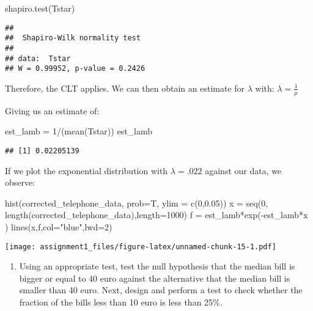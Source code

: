 \documentclass[
]{article}
\newenvironment{Shaded}{\begin{snugshade}}{\end{snugshade}}
\newcommand{\AttributeTok}[1]{\textcolor[rgb]{0.77,0.63,0.00}{#1}}
\newcommand{\DecValTok}[1]{\textcolor[rgb]{0.00,0.00,0.81}{#1}}
\newcommand{\FloatTok}[1]{\textcolor[rgb]{0.00,0.00,0.81}{#1}}
\newcommand{\FunctionTok}[1]{\textcolor[rgb]{0.00,0.00,0.00}{#1}}
\newcommand{\NormalTok}[1]{#1}
\newcommand{\OtherTok}[1]{\textcolor[rgb]{0.56,0.35,0.01}{#1}}
\newcommand{\SpecialCharTok}[1]{\textcolor[rgb]{0.00,0.00,0.00}{#1}}
\newcommand{\StringTok}[1]{\textcolor[rgb]{0.31,0.60,0.02}{#1}}
\providecommand{\tightlist}{%
  \setlength{\itemsep}{0pt}\setlength{\parskip}{0pt}}
\begin{document}
\begin{Shaded}
\begin{Highlighting}[]
\FunctionTok{shapiro.test}\NormalTok{(Tstar)}
\end{Highlighting}
\end{Shaded}

\begin{verbatim}
## 
##  Shapiro-Wilk normality test
## 
## data:  Tstar
## W = 0.99952, p-value = 0.2426
\end{verbatim}

Therefore, the CLT applies. We can then obtain an estimate for
\(\lambda\) with: \(\lambda = \frac{1}{\mu}\)

Giving us an estimate of:

\begin{Shaded}
\begin{Highlighting}[]
\NormalTok{est\_lamb }\OtherTok{=} \DecValTok{1}\SpecialCharTok{/}\NormalTok{(}\FunctionTok{mean}\NormalTok{(Tstar))}
\NormalTok{est\_lamb}
\end{Highlighting}
\end{Shaded}

\begin{verbatim}
## [1] 0.02205139
\end{verbatim}

If we plot the exponential distribution with \(\lambda = .022\) against
our data, we observe:

\begin{Shaded}
\begin{Highlighting}[]
\FunctionTok{hist}\NormalTok{(corrected\_telephone\_data, }\AttributeTok{prob=}\NormalTok{T, }\AttributeTok{ylim =} \FunctionTok{c}\NormalTok{(}\DecValTok{0}\NormalTok{,}\FloatTok{0.05}\NormalTok{))}
\NormalTok{x }\OtherTok{=} \FunctionTok{seq}\NormalTok{(}\DecValTok{0}\NormalTok{, }\FunctionTok{length}\NormalTok{(corrected\_telephone\_data),}\AttributeTok{length=}\DecValTok{1000}\NormalTok{)}
\NormalTok{f }\OtherTok{=}\NormalTok{ est\_lamb}\SpecialCharTok{*}\FunctionTok{exp}\NormalTok{(}\SpecialCharTok{{-}}\NormalTok{est\_lamb}\SpecialCharTok{*}\NormalTok{x )}
\FunctionTok{lines}\NormalTok{(x,f,}\AttributeTok{col=}\StringTok{"blue"}\NormalTok{,}\AttributeTok{lwd=}\DecValTok{2}\NormalTok{)}
\end{Highlighting}
\end{Shaded}

\texttt{[image: assignment1\_files/figure-latex/unnamed-chunk-15-1.pdf]}

\begin{enumerate}
\def\labelenumi{\alph{enumi})}
\setcounter{enumi}{4}
\tightlist
\item
  Using an appropriate test, test the null hypothesis that the median
  bill is bigger or equal to 40 euro against the alternative that the
  median bill is smaller than 40 euro. Next, design and perform a test
  to check whether the fraction of the bills less than 10 euro is less
  than 25\%.
\end{enumerate}
\end{document}
